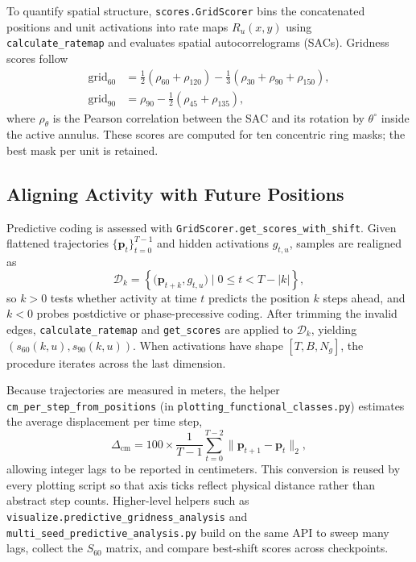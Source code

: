\documentclass[11pt]{article}
\begin{document}
To quantify spatial structure, \texttt{scores.GridScorer} bins the concatenated positions and unit activations into rate maps $R_u(x,y)$ using \texttt{calculate\_ratemap} and evaluates spatial autocorrelograms (SACs). Gridness scores follow
\begin{align}
    \mathrm{grid}_{60} &= \tfrac{1}{2}\left(\rho_{60} + \rho_{120}\right) - \tfrac{1}{3}\left(\rho_{30} + \rho_{90} + \rho_{150}\right),\\
    \mathrm{grid}_{90} &= \rho_{90} - \tfrac{1}{2}(\rho_{45} + \rho_{135}),
\end{align}
where $\rho_{\theta}$ is the Pearson correlation between the SAC and its rotation by $\theta^\circ$ inside the active annulus. These scores are computed for ten concentric ring masks; the best mask per unit is retained.

\subsection{Aligning Activity with Future Positions}
Predictive coding is assessed with \texttt{GridScorer.get\_scores\_with\_shift}. Given flattened trajectories $\{\mathbf{p}_t\}_{t=0}^{T-1}$ and hidden activations $g_{t,u}$, samples are realigned as
\begin{equation}
    \mathcal{D}_k = \left\{\big(\mathbf{p}_{t+k}, g_{t,u}\big) \mid 0 \le t < T - |k| \right\},
\end{equation}
so $k>0$ tests whether activity at time $t$ predicts the position $k$ steps ahead, and $k<0$ probes postdictive or phase-precessive coding. After trimming the invalid edges, \texttt{calculate\_ratemap} and \texttt{get\_scores} are applied to $\mathcal{D}_k$, yielding $(s_{60}(k,u), s_{90}(k,u))$. When activations have shape $[T,B,N_g]$, the procedure iterates across the last dimension.

Because trajectories are measured in meters, the helper \texttt{cm\_per\_step\_from\_positions} (in \texttt{plotting\_functional\_classes.py}) estimates the average displacement per time step,
\begin{equation}
    \Delta_{\mathrm{cm}} = 100 \times \frac{1}{T-1} \sum_{t=0}^{T-2} \big\lVert \mathbf{p}_{t+1} - \mathbf{p}_{t} \big\rVert_2,
\end{equation}
allowing integer lags to be reported in centimeters. This conversion is reused by every plotting script so that axis ticks reflect physical distance rather than abstract step counts. Higher-level helpers such as \texttt{visualize.predictive\_gridness\_analysis} and \texttt{multi\_seed\_predictive\_analysis.py} build on the same API to sweep many lags, collect the $S_{60}$ matrix, and compare best-shift scores across checkpoints.
\end{document}

